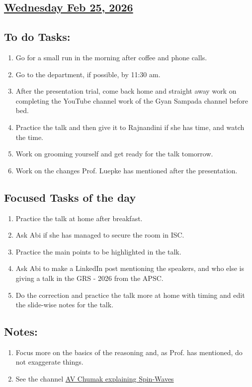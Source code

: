 \subsection*{\underline{Wednesday Feb 25, 2026} }
\subsection*{To do Tasks:}
\begin{enumerate}
    \item Go for a small run in the morning after coffee and phone calls. \xmark
    \item Go to the department, if possible, by 11:30 am. \cmark
    \item After the presentation trial, come back home and straight away work on completing the YouTube channel work of the Gyan Sampada channel before bed.
    \item Practice the talk and then give it to Rajnandini if she has time, and watch the time.
    \item Work on grooming yourself and get ready for the talk tomorrow.
    \item Work on the changes Prof. Luepke has mentioned after the presentation.
\end{enumerate}
\subsection*{Focused Tasks of the day}
\begin{enumerate}[\ding{212}]  %
    \item Practice the talk at home after breakfast. \cmark
    \item Ask Abi if she has managed to secure the room in ISC. \cmark
    \item Practice the main points to be highlighted in the talk. \cmark
    \item Ask Abi to make a LinkedIn post mentioning the speakers, and who else is giving a talk in the GRS - 2026 from the APSC. \cmark
    \item Do the correction and practice the talk more at home with timing and edit the slide-wise notes for the talk.
\end{enumerate}
\subsection*{Notes:}
\begin{enumerate}
    \item Focus more on the basics of the reasoning and, as Prof. has mentioned, do not exaggerate things. 
    \item See the channel \href{https://youtu.be/V5b48utfpMQ}{AV Chumak explaining Spin-Waves}
\end{enumerate}
